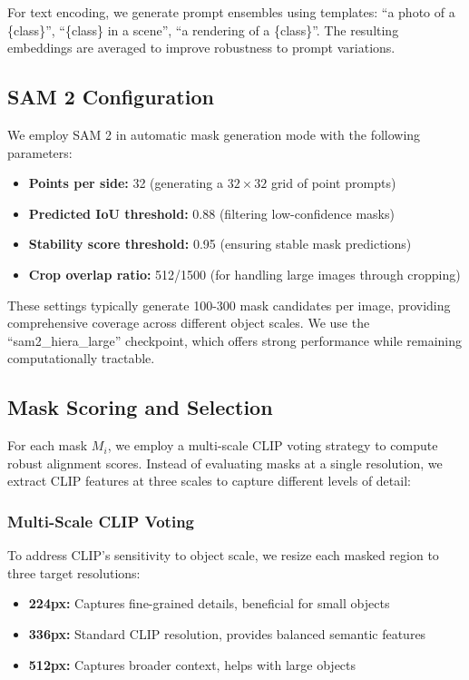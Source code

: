 For text encoding, we generate prompt ensembles using templates: ``a photo of a \{class\}'', ``\{class\} in a scene'', ``a rendering of a \{class\}''. The resulting embeddings are averaged to improve robustness to prompt variations.

\subsection{SAM 2 Configuration}

We employ SAM 2 in automatic mask generation mode with the following parameters:

\begin{itemize}
    \item \textbf{Points per side:} 32 (generating a $32 \times 32$ grid of point prompts)
    \item \textbf{Predicted IoU threshold:} 0.88 (filtering low-confidence masks)
    \item \textbf{Stability score threshold:} 0.95 (ensuring stable mask predictions)
    \item \textbf{Crop overlap ratio:} 512/1500 (for handling large images through cropping)
\end{itemize}

These settings typically generate 100-300 mask candidates per image, providing comprehensive coverage across different object scales. We use the ``sam2\_hiera\_large'' checkpoint, which offers strong performance while remaining computationally tractable.

\subsection{Mask Scoring and Selection}

For each mask $M_i$, we employ a multi-scale CLIP voting strategy to compute robust alignment scores. Instead of evaluating masks at a single resolution, we extract CLIP features at three scales to capture different levels of detail:

\subsubsection{Multi-Scale CLIP Voting}

To address CLIP's sensitivity to object scale, we resize each masked region to three target resolutions:
\begin{itemize}
    \item \textbf{224px:} Captures fine-grained details, beneficial for small objects
    \item \textbf{336px:} Standard CLIP resolution, provides balanced semantic features
    \item \textbf{512px:} Captures broader context, helps with large objects
\end{itemize}

